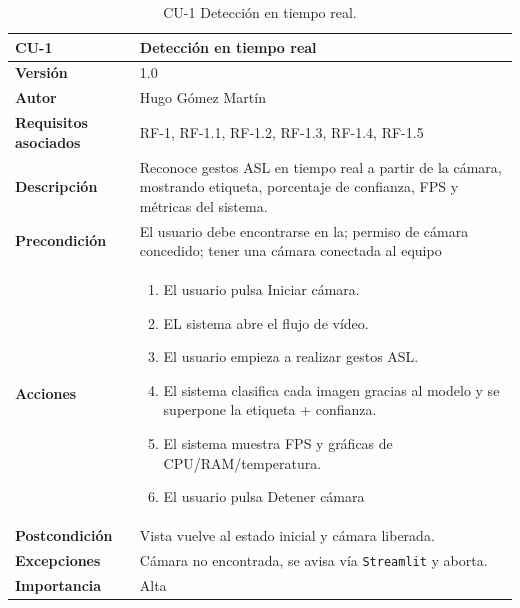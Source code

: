\begin{table}[p]
	\centering
	\begin{tabularx}{\linewidth}{ p{} p{} }
		\toprule
		\textbf{CU-1}    & \textbf{Detección en tiempo real}\\
		\toprule
		\textbf{Versión}              & 1.0    \\
		\textbf{Autor}                & Hugo Gómez Martín \\
		\textbf{Requisitos asociados} & RF-1, RF-1.1, RF-1.2, RF-1.3, RF-1.4, RF-1.5 \\
		\textbf{Descripción}          & Reconoce gestos ASL en tiempo real a partir de la cámara, mostrando etiqueta, porcentaje de confianza, FPS y métricas del sistema. \\
		\textbf{Precondición}         & El usuario debe encontrarse en la; permiso de cámara concedido; tener una cámara conectada al equipo \\
		\textbf{Acciones}             &
		\begin{enumerate}
			\def\labelenumi{\arabic{enumi}.}
			\tightlist
			\item El usuario pulsa Iniciar cámara.
			\item EL sistema abre el flujo de vídeo.
                \item El usuario empieza a realizar gestos ASL.
                \item El sistema clasifica cada imagen gracias al modelo y se superpone la etiqueta + confianza.
                \item El sistema muestra FPS y gráficas de CPU/RAM/temperatura.
                \item El usuario pulsa Detener cámara
		\end{enumerate}\\
		\textbf{Postcondición}        & Vista vuelve al estado inicial y cámara liberada. \\
		\textbf{Excepciones}          & Cámara no encontrada, se avisa vía \texttt{Streamlit} y aborta. \\
		\textbf{Importancia}          & Alta \\
		\bottomrule
	\end{tabularx}
	\caption{CU-1 Detección en tiempo real.}
\end{table}

